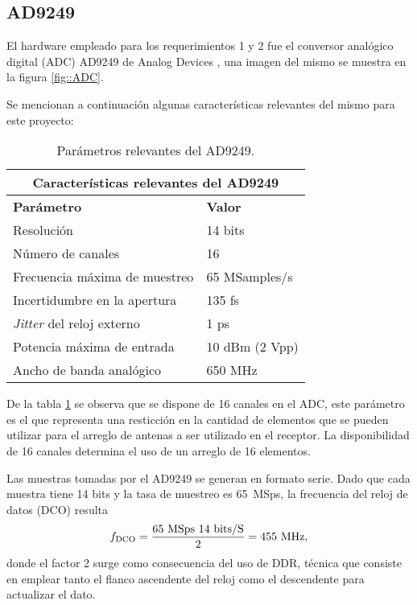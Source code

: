 \documentclass[../../main.tex]{subfiles}
\begin{document}
\subsection{AD9249}
El hardware empleado para los requerimientos 1 y 2 fue el conversor analógico digital (ADC) AD9249 de Analog Devices \cite{AD9249}, una imagen del mismo se muestra en la figura \ref{fig::ADC}.

Se mencionan a continuación algunas características relevantes del mismo para este proyecto:
\begin{table}[H]
    \centering
    \begin{tabular}{|ll|}
    \hline
    \multicolumn{2}{|c|}{\textbf{Características relevantes del AD9249}}                      \\ \hline
    \multicolumn{1}{|l|}{\textbf{Parámetro}}                                          & \textbf{Valor}          \\ \hline
    \multicolumn{1}{|l|}{Resolución}                                         & 14 bits        \\ \hline
    \multicolumn{1}{|l|}{Número de canales}                                  & 16             \\ \hline
    \multicolumn{1}{|l|}{Frecuencia máxima de muestreo}                      & 65 MSamples/s  \\ \hline
    \multicolumn{1}{|l|}{Incertidumbre en la apertura}                       & 135 fs         \\ \hline
    \multicolumn{1}{|l|}{\textit{Jitter} del reloj externo} & 1 ps           \\ \hline
    \multicolumn{1}{|l|}{Potencia máxima de entrada}                         & 10 dBm (2 Vpp) \\ \hline
    \multicolumn{1}{|l|}{Ancho de banda analógico}                           & 650 MHz        \\ \hline
    \end{tabular}
    \caption{Parámetros relevantes del AD9249.}
    \label{tab::ADC}
\end{table}

De la tabla \ref{tab::ADC} se observa que se dispone de 16 canales en el ADC, este parámetro es el que representa una resticción en la cantidad de elementos que se pueden utilizar para el arreglo de antenas a ser utilizado en el receptor. La disponibilidad de 16 canales determina el uso de un arreglo de 16 elementos.

Las muestras tomadas por el AD9249 se generan en formato serie. Dado que cada muestra tiene 14 bits y la tasa de muestreo es 65~MSps, la frecuencia del reloj de datos (DCO) resulta
\begin{equation}
    f_\textrm{DCO} = \frac{65\un{MSps} \ 14\un{bits/S}}{2} = 455\un{MHz},
    \label{eq::DCO}
\end{equation}
donde el factor 2 surge como consecuencia del uso de DDR, técnica que consiste en emplear tanto el flanco ascendente del reloj como el descendente para actualizar el dato.
\end{document}
